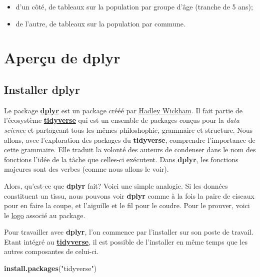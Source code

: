 \documentclass[]{book}
\newenvironment{Shaded}{\begin{snugshade}}{\end{snugshade}}
\newcommand{\KeywordTok}[1]{\textcolor[rgb]{0.13,0.29,0.53}{\textbf{#1}}}
\newcommand{\StringTok}[1]{\textcolor[rgb]{0.31,0.60,0.02}{#1}}
\newcommand{\NormalTok}[1]{#1}
\begin{document}
\begin{itemize}
\item
  d'un côté, de tableaux sur la population par groupe d'âge (tranche de
  5 ans);
\item
  de l'autre, de tableaux sur la population par commune.
\end{itemize}

\section{\texorpdfstring{Aperçu de
\textbf{dplyr}}{Aperçu de dplyr}}\label{apercu-de-dplyr}

\subsection{\texorpdfstring{Installer
\textbf{dplyr}}{Installer dplyr}}\label{installer-dplyr}

Le package \href{https://dplyr.tidyverse.org/}{\textbf{dplyr}} est un
package crééé par \href{http://hadley.nz/}{Hadley Wickham}. Il fait
partie de l'écosystème
\href{https://www.tidyverse.org/}{\textbf{tidyverse}} qui est un
ensemble de packages conçus pour la \emph{data science} et partageant
tous les mêmes philoshophie, grammaire et structure. Nous allons, avec
l'exploration des packages du \textbf{tidyverse}, comprendre
l'importance de cette grammaire. Elle traduit la volonté des auteurs de
condenser dans le nom des fonctions l'idée de la tâche que celles-ci
exécutent. Dans \textbf{dplyr}, les fonctions majeures sont des verbes
(comme nous allons le voir).

Alors, qu'est-ce que \textbf{dplyr} fait? Voici une simple analogie. Si
les données constituent un tissu, nous pouvons voir \textbf{dplyr} comme
à la fois la paire de ciseaux pour en faire la coupe, et l'aiguille et
le fil pour le coudre. Pour le prouver, voici le
\href{https://github.com/tidyverse/dplyr/blob/master/pkgdown/favicon/apple-touch-icon-120x120.png}{logo}
associé au package.

Pour travailler avec \textbf{dplyr}, l'on commence par l'installer sur
son poste de travail. Etant intégré au
\href{https://www.tidyverse.org/}{\textbf{tidyverse}}, il est possible
de l'installer en même temps que les autres composantes de celui-ci.

\begin{Shaded}
\begin{Highlighting}[]
\KeywordTok{install.packages}\NormalTok{(}\StringTok{"tidyverse"}\NormalTok{)}
\end{Highlighting}
\end{Shaded}
\end{document}
